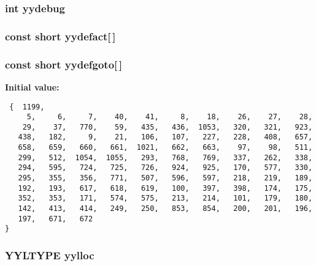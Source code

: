 \subsubsection{\setlength{\rightskip}{0pt plus 5cm}int yydebug}\label{parser_8c_a194}


\subsubsection{\setlength{\rightskip}{0pt plus 5cm}const short yydefact[$\,$]\hspace{0.3cm}{\tt  [static]}}\label{parser_8c_a184}


\subsubsection{\setlength{\rightskip}{0pt plus 5cm}const short yydefgoto[$\,$]\hspace{0.3cm}{\tt  [static]}}\label{parser_8c_a185}


{\bf Initial value:}

\footnotesize\begin{verbatim} {  1199,
     5,     6,     7,    40,    41,     8,    18,    26,    27,    28,
    29,    37,   770,    59,   435,   436,  1053,   320,   321,   923,
   438,   182,     9,    21,   106,   107,   227,   228,   408,   657,
   658,   659,   660,   661,  1021,   662,   663,    97,    98,   511,
   299,   512,  1054,  1055,   293,   768,   769,   337,   262,   338,
   294,   595,   724,   725,   726,   924,   925,   170,   577,   330,
   295,   355,   356,   771,   507,   596,   597,   218,   219,   189,
   192,   193,   617,   618,   619,   100,   397,   398,   174,   175,
   352,   353,   171,   574,   575,   213,   214,   101,   179,   180,
   142,   413,   414,   249,   250,   853,   854,   200,   201,   196,
   197,   671,   672
}\end{verbatim}\normalsize 
{}
\subsubsection{\setlength{\rightskip}{0pt plus 5cm}YYLTYPE yylloc}\label{parser_8c_a192}


